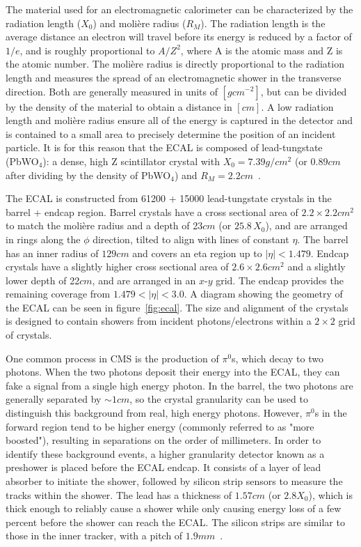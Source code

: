 The material used for an electromagnetic calorimeter can be characterized by the radiation length ($X_0$) and moli\`ere radius ($R_M$). The radiation length is the average distance an electron will travel before its energy is reduced by a factor of $1/e$, and is roughly proportional to $A/Z^2$, where A is the atomic mass and Z is the atomic number. The moli\`ere radius is directly proportional to the radiation length and measures the spread of an electromagnetic shower in the transverse direction. Both are generally measured in units of $\left[\si{g}\unit{cm^{-2}}\right]$, but can be divided by the density of the material to obtain a distance in $\left[\si{cm}\right]$. A low radiation length and moli\`ere radius ensure all of the energy is captured in the detector and is contained to a small area to precisely determine the position of an incident particle. It is for this reason that the ECAL is composed of lead-tungstate (PbWO$_4$): a dense, high Z scintillator crystal with $X_0=7.39\unit{g/cm^2}$ (or $0.89\unit{cm}$ after dividing by the density of PbWO$_4$) and $R_M=2.2\unit{cm}$~\cite{Workman:2022ynf}.

The ECAL is constructed from 61200 + 15000 lead-tungstate crystals in the barrel + endcap region. Barrel crystals have a cross sectional area of $2.2\times2.2\unit{cm^2}$ to match the moli\`ere radius and a depth of 23$\unit{cm}$ (or $25.8\,X_0$), and are arranged in rings along the $\phi$ direction, tilted to align with lines of constant $\eta$. The barrel has an inner radius of $129\unit{cm}$ and covers an eta region up to $\left|\eta\right|<1.479$. Endcap crystals have a slightly higher cross sectional area of $2.6\times2.6\unit{cm^2}$ and a slightly lower depth of 22$\unit{cm}$, and are arranged in an $x$-$y$ grid. The endcap provides the remaining coverage from $1.479<\left|\eta\right|<3.0$. A diagram showing the geometry of the ECAL can be seen in figure~\ref{fig:ecal}. The size and alignment of the crystals is designed to contain showers from incident photons/electrons within a $2\times2$ grid of crystals.

One common process in CMS is the production of $\pi^0$s, which decay to two photons. When the two photons deposit their energy into the ECAL, they can fake a signal from a single high energy photon. In the barrel, the two photons are generally separated by $\sim1\unit{cm}$, so the crystal granularity can be used to distinguish this background from real, high energy photons. However, $\pi^0$s in the forward region tend to be higher energy (commonly referred to as "more boosted"), resulting in separations on the order of millimeters. In order to identify these background events, a higher granularity detector known as a preshower is placed before the ECAL endcap. It consists of a layer of lead absorber to initiate the shower, followed by silicon strip sensors to measure the tracks within the shower. The lead has a thickness of $1.57\unit{cm}$ (or $2.8X_0$), which is thick enough to reliably cause a shower while only causing energy loss of a few percent before the shower can reach the ECAL. The silicon strips are similar to those in the inner tracker, with a pitch of $1.9\unit{mm}$~\cite{TOURNEFIER2001355}.

